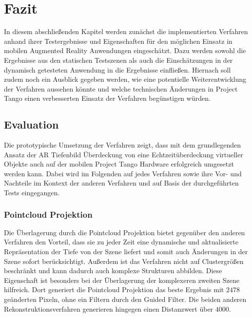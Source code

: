 \chapter{Fazit} \label{sec:conclusion}

In diesem abschließenden Kapitel werden zunächst die implementierten Verfahren anhand ihrer Testergebnisse und Eigenschaften für den möglichen Einsatz in mobilen Augmented Reality Anwendungen eingeschätzt. Dazu werden sowohl die Ergebnisse aus den statischen Testszenen als auch die Einschätzungen in der dynamisch getesteten Anwendung in die Ergebnisse einfließen. Hiernach soll zudem noch ein Ausblick gegeben werden, wie eine potentielle Weiterentwicklung der Verfahren aussehen könnte und welche technischen Änderungen in Project Tango einen verbesserten Einsatz der Verfahren begünstigen würden.

\section{Evaluation}

Die prototypische Umsetzung der Verfahren zeigt, dass mit dem grundlegenden Ansatz der AR Tiefenbild Überdeckung von \citet{wloka1995resolving} eine Echtzeitüberdeckung virtueller Objekte auch auf der mobilen Project Tango Hardware erfolgreich umgesetzt werden kann. Dabei wird im Folgenden auf jedes Verfahren sowie ihre Vor- und Nachteile im Kontext der anderen Verfahren und auf Basis der durchgeführten Tests eingegangen. 

\subsection*{Pointcloud Projektion}

Die Überlagerung durch die Pointcloud Projektion bietet gegenüber den anderen Verfahren den Vorteil, dass sie zu jeder Zeit eine dynamische und aktualisierte Repräsentation der Tiefe von der Szene liefert und somit auch Änderungen in der Szene sofort berücksichtigt. Außerdem ist das Verfahren nicht auf Clustergrößen beschränkt und kann dadurch auch komplexe Strukturen abbilden. Diese Eigenschaft ist besonders bei der Überlagerung der komplexeren zweiten Szene hilfreich. Dort generiert die Pointcloud Projektion das beste Ergebnis mit \(2478\) geänderten Pixeln, ohne ein Filtern durch den Guided Filter. Die beiden anderen Rekonstruktionsverfahren generieren hingegen einen Distanzwert über \(4000\).

